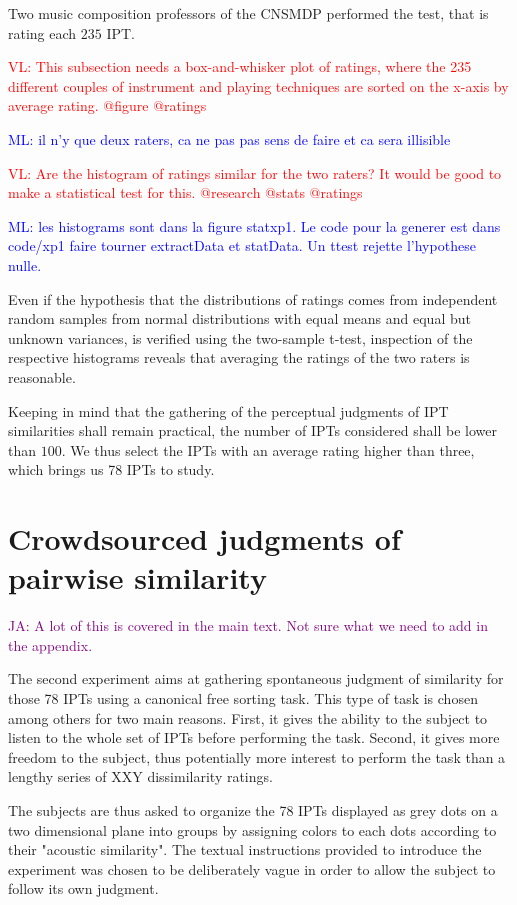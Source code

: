 \documentclass{bmcart}
\newcommand{\ipt}{IPT\xspace}
\newcommand{\ipts}{IPTs\xspace}
\newcommand{\ml}[1]{\textcolor{blue}{ML: #1}}
\newcommand{\vl}[1]{\textcolor{red}{VL: #1}}
\newcommand{\ja}[1]{\textcolor{purple}{JA: #1}}
\begin{document}
\begin{backmatter}
Two music composition professors of the CNSMDP performed the test, that is rating each $235$ \ipt.

\vl{This subsection needs a box-and-whisker plot of ratings, where the 235 different
couples of instrument and playing techniques are sorted on the x-axis by average rating. @figure @ratings}

\ml{il n'y que deux raters, ca ne pas pas sens de faire et ca sera illisible}

\vl{Are the histogram of ratings similar for the two raters? It would be good to make a statistical test for this. @research @stats @ratings}

\ml{les histograms sont dans la figure statxp1. Le code pour la generer est dans code/xp1 faire tourner extractData et statData. Un ttest rejette l'hypothese nulle.}

Even if the hypothesis that the distributions of ratings comes from independent random samples from normal distributions with equal means and equal but unknown variances, is verified using the two-sample t-test, inspection of the respective histograms reveals that averaging the ratings of the two raters is reasonable.

Keeping in mind that the gathering of the perceptual judgments of \ipt similarities shall remain practical, the number of \ipts considered shall be lower than $100$. We thus select the \ipts with an average rating higher than three, which brings us 78 \ipts to study.

\section*{Crowdsourced judgments of pairwise similarity}

\ja{A lot of this is covered in the main text.
Not sure what we need to add in the appendix.}

The second experiment aims at gathering spontaneous judgment of similarity for those 78 \ipts using a canonical free sorting task. This type of task is chosen among others for two main reasons. First, it gives the ability to the subject to listen to the whole set of \ipts before performing the task. Second, it gives more freedom to the subject, thus potentially more interest to perform the task than a lengthy series of XXY dissimilarity ratings.

The subjects are thus asked to organize the 78 \ipts displayed as grey dots on a two dimensional plane into groups by assigning colors to each dots according to their "acoustic similarity". The textual instructions provided to introduce the experiment was chosen to be deliberately vague in order to allow the subject to follow its own judgment.


\end{backmatter}
\end{document}
